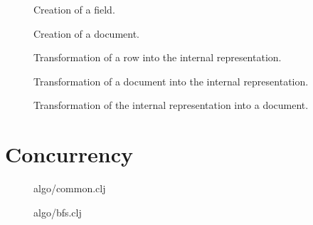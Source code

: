 \documentclass[12pt,letterpaper,oneside,notitlepage]{report}
\theoremstyle{definition}
\begin{document}
		\begin{figure}[ht!]
			\caption{Creation of a field.}
			\label{src:molly-datatypes-entity-field}
		\end{figure}
		
		\begin{figure}[ht!]
			\caption{Creation of a document.}
			\label{src:molly-datatypes-entity-document}
		\end{figure}
		
		\begin{figure}[ht!]
			\caption{Transformation of a row into the internal representation.}
			\label{src:molly-datatypes-entity-row-data}
		\end{figure}
		
		\begin{figure}[ht!]
			\caption{Transformation of a document into the internal representation.}
			\label{src:molly-datatypes-entity-doc-data}
		\end{figure}
		
		\begin{figure}[ht!]
			\caption{Transformation of the internal representation into a document.}
			\label{src:molly-datatypes-entity-data-doc}
		\end{figure}
		
	
	\chapter{Concurrency}
		\begin{figure}[ht!]
			
			\caption{algo/common.clj}
		\end{figure}
		
		\begin{figure}[ht!]
			
			\caption{algo/bfs.clj}
		\end{figure}
		
\end{document}
